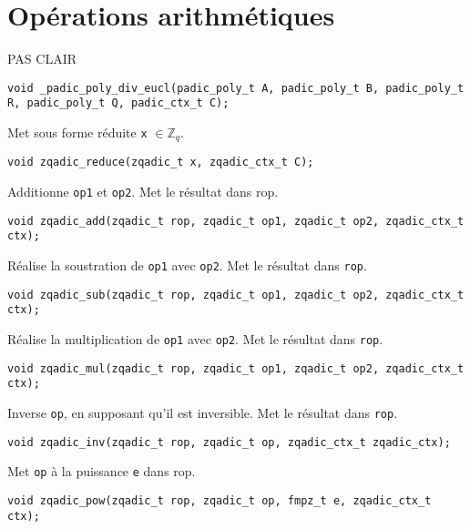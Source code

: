 \documentclass[11pt]{article}
\begin{document}
\section{Opérations arithmétiques}

PAS CLAIR 
\begin{verbatim}
void _padic_poly_div_eucl(padic_poly_t A, padic_poly_t B, padic_poly_t R, padic_poly_t Q, padic_ctx_t C);
\end{verbatim}

Met sous forme réduite \texttt{x} $\in \mathbb{Z}_q$. 
\begin{verbatim}
void zqadic_reduce(zqadic_t x, zqadic_ctx_t C);
\end{verbatim}

Additionne \texttt{op1} et \texttt{op2}. Met le résultat dans rop. 
\begin{verbatim}
void zqadic_add(zqadic_t rop, zqadic_t op1, zqadic_t op2, zqadic_ctx_t ctx);
\end{verbatim}

Réalise la soustration de \texttt{op1} avec \texttt{op2}. Met le résultat dans \texttt{rop}. 
\begin{verbatim}
void zqadic_sub(zqadic_t rop, zqadic_t op1, zqadic_t op2, zqadic_ctx_t ctx);
\end{verbatim}

Réalise la multiplication de \texttt{op1} avec \texttt{op2}. Met le résultat dans \texttt{rop}. 
\begin{verbatim}
void zqadic_mul(zqadic_t rop, zqadic_t op1, zqadic_t op2, zqadic_ctx_t ctx);
\end{verbatim}

Inverse \texttt{op}, en supposant qu'il est inversible. Met le résultat dans \texttt{rop}. 
\begin{verbatim}
void zqadic_inv(zqadic_t rop, zqadic_t op, zqadic_ctx_t zqadic_ctx);
\end{verbatim}

Met \texttt{op} à la puissance \texttt{e} dans rop. 
\begin{verbatim}
void zqadic_pow(zqadic_t rop, zqadic_t op, fmpz_t e, zqadic_ctx_t ctx);
\end{verbatim}
\end{document}

